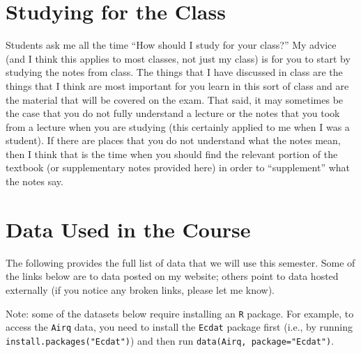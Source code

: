 \documentclass[
  letterpaper,
  DIV=11,
  numbers=noendperiod]{scrreprt}
\begin{document}
\section{Studying for the Class}\label{studying-for-the-class}

Students ask me all the time ``How should I study for your class?'' My
advice (and I think this applies to most classes, not just my class) is
for you to start by studying the notes from class. The things that I
have discussed in class are the things that I think are most important
for you learn in this sort of class and are the material that will be
covered on the exam. That said, it may sometimes be the case that you do
not fully understand a lecture or the notes that you took from a lecture
when you are studying (this certainly applied to me when I was a
student). If there are places that you do not understand what the notes
mean, then I think that is the time when you should find the relevant
portion of the textbook (or supplementary notes provided here) in order
to ``supplement'' what the notes say.

\section{Data Used in the Course}\label{data-used-in-the-course}

The following provides the full list of data that we will use this
semester. Some of the links below are to data posted on my website;
others point to data hosted externally (if you notice any broken links,
please let me know).

Note: some of the datasets below require installing an \texttt{R}
package. For example, to access the \texttt{Airq} data, you need to
install the \texttt{Ecdat} package first (i.e., by running
\texttt{install.packages("Ecdat")}) and then run
\texttt{data(Airq,\ package="Ecdat")}.
\end{document}
